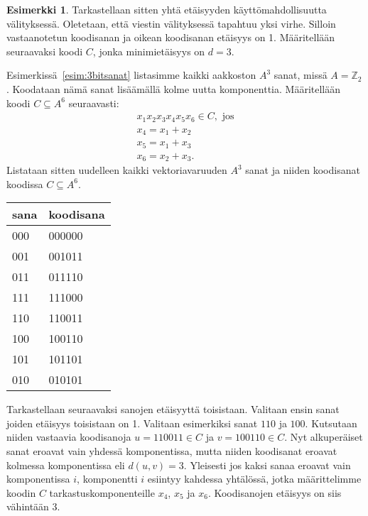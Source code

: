 \documentclass[a4paper,12pt,leqno,oneside]{report} %
\theoremstyle{plain}
\theoremstyle{plain}
\theoremstyle{definition}
\newtheorem{esimerkki}{Esimerkki}[chapter]
\theoremstyle{remark}
\numberwithin{equation}{chapter}
\newcommand*{\Zset}{\mathbb{Z}}  %
\begin{document}
    \begin{esimerkki}\label{esim:minetaisyys}
        Tarkastellaan sitten yhtä etäisyyden käyttömahdollisuutta välityksessä. Oletetaan, että viestin välityksessä tapahtuu yksi virhe. Silloin vastaanotetun koodisanan ja oikean koodisanan etäisyys on 1. Määritellään seuraavaksi koodi $C$, jonka minimietäisyys on $d = 3$.

        Esimerkissä~\ref{esim:3bitsanat} listasimme kaikki aakkoston $A^3$ sanat, missä $A = \Zset_2$. Koodataan nämä sanat lisäämällä kolme uutta komponenttia. Määritellään koodi $C \subseteq A^6$ seuraavasti:
        \begin{gather*}
            x_1x_2x_3x_4x_5x_6 \in C, \text{ jos} \\
            x_4 = x_1 + x_2 \\
            x_5 = x_1 + x_3 \\
            x_6 = x_2 + x_3.
        \end{gather*}
        Listataan sitten uudelleen kaikki vektoriavaruuden $A^3$ sanat ja niiden koodisanat koodissa $C \subseteq A^6$.
        \begin{center}
            \begin{tabular}[t]{ll}
                sana & koodisana \\ \midrule
                000 & 000000\\
                001 & 001011\\
                011 & 011110\\
                111 & 111000\\
                110 & 110011\\
                100 & 100110\\
                101 & 101101\\
                010 & 010101\\
            \end{tabular}
        \end{center}
        Tarkastellaan seuraavaksi sanojen etäisyyttä toisistaan. Valitaan ensin sanat joiden etäisyys toisistaan on 1. Valitaan esimerkiksi sanat $110$ ja $100$. Kutsutaan niiden vastaavia koodisanoja $u = 110011 \in C$ ja $v = 100110 \in C$. Nyt alkuperäiset sanat eroavat vain yhdessä komponentissa, mutta niiden koodisanat eroavat kolmessa komponentissa eli $d(u,v) = 3$. Yleisesti jos kaksi sanaa eroavat vain komponentissa $i$, komponentti $i$ esiintyy kahdessa yhtälössä, jotka määrittelimme koodin $C$ tarkastuskomponenteille
        $x_4$, $x_5$ ja $x_6$. Koodisanojen etäisyys on siis vähintään 3.


\end{esimerkki}
\end{document}
